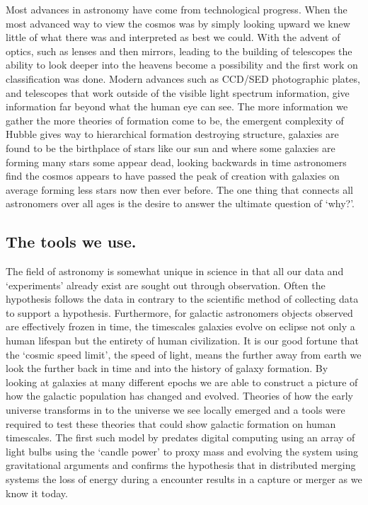 Most advances in astronomy have come from technological progress. When the most advanced way to view the cosmos was by simply looking upward we knew little of what there was and interpreted as best we could. With the advent of optics, such as lenses and then mirrors, leading to the building of telescopes the ability to look deeper into the heavens become a possibility and the first work on classification was done. Modern advances such as CCD/SED photographic plates, and telescopes that work outside of the visible light spectrum information, give information far beyond what the human eye can see. The more information we gather the more theories of formation come to be, the emergent complexity of Hubble gives way to hierarchical formation destroying structure, galaxies are found to be the birthplace of stars like our sun and where some galaxies are forming many stars some appear dead, looking backwards in time astronomers find the cosmos appears to have passed the peak of creation with galaxies on average forming less stars now then ever before. The one thing that connects all astronomers over all ages is the desire to answer the ultimate question of `why?'.

\subsection{The tools we use.}
The field of astronomy is somewhat unique in science in that all our data and `experiments' already exist are sought out through observation. Often the hypothesis follows the data in contrary to the scientific method of collecting data to support a hypothesis. Furthermore, for galactic astronomers objects observed are effectively frozen in time, the timescales galaxies evolve on eclipse not only a human lifespan but the entirety of human civilization. It is our good fortune that the `cosmic speed limit', the speed of light, means the further away from earth we look the further back in time and into the history of galaxy formation. By looking at galaxies at many different epochs we are able to construct a picture of how the galactic population has changed and evolved. Theories of how the early universe transforms in to the universe we see locally emerged and a tools were required to test these theories that could show galactic formation on human timescales. The first such model by \citet{Holmberg1941OnProcedure.} predates digital computing using an array of light bulbs using the `candle power' to proxy mass and evolving the system using gravitational arguments and confirms the hypothesis that in distributed merging systems the loss of energy during a encounter results in a capture or merger as we know it today.

